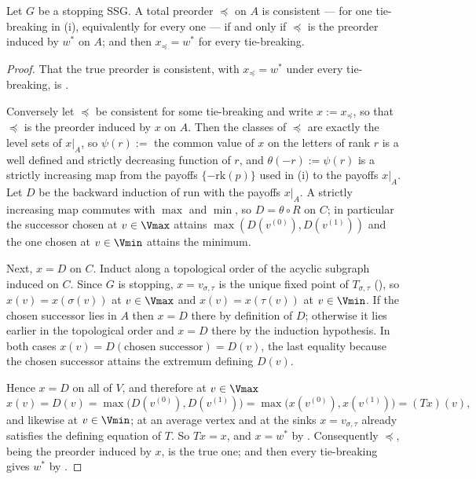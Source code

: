\begin{theorem}\label{ol:unique}
Let $G$ be a stopping SSG. A total preorder $\preceq$ on $A$ is consistent
--- for one tie-breaking in (i), equivalently for
every one --- if and only if $\preceq$ is the preorder induced by $w^\ast$
on $A$; and then $x_\preceq=w^\ast$ for every tie-breaking.
\end{theorem}

\begin{proof}
That the true preorder is consistent, with $x_\preceq=w^\ast$ under every
tie-breaking, is .

Conversely let $\preceq$ be consistent for some tie-breaking and write
$x:=x_{\preceq}$, so that $\preceq$ is the preorder induced by $x$ on $A$.
Then the classes of $\preceq$ are exactly the level sets of $x|_A$, so
$\psi(r):=$ the common value of $x$ on the letters of rank $r$ is a well
defined and strictly decreasing function of $r$, and
$\theta(-r):=\psi(r)$ is a strictly increasing map from the payoffs
$\{-\mathrm{rk}(p)\}$ used in (i) to the payoffs
$x|_A$. Let $D$ be the backward induction of  run with
the payoffs $x|_A$. A strictly increasing map commutes with $\max$ and
$\min$, so $D=\theta\circ R$ on $C$; in particular the successor chosen at
$v\in\Vmax$ attains $\max(D(v^{(0)}),D(v^{(1)}))$ and the one chosen at
$v\in\Vmin$ attains the minimum.

Next, $x=D$ on $C$. Induct along a topological order of the acyclic
subgraph induced on $C$. Since $G$ is stopping, $x=v_{\sigma,\tau}$ is the
unique fixed point of $T_{\sigma,\tau}$ (), so
$x(v)=x(\sigma(v))$ at $v\in\Vmax$ and $x(v)=x(\tau(v))$ at $v\in\Vmin$.
If the chosen successor lies in $A$ then $x=D$ there by definition of $D$;
otherwise it lies earlier in the topological order and $x=D$ there by the
induction hypothesis. In both cases
$x(v)=D(\text{chosen successor})=D(v)$, the last equality because the
chosen successor attains the extremum defining $D(v)$.

Hence $x=D$ on all of $V$, and therefore at $v\in\Vmax$
\[
  x(v)=D(v)=\max\bigl(D(v^{(0)}),D(v^{(1)})\bigr)
       =\max\bigl(x(v^{(0)}),x(v^{(1)})\bigr)=(Tx)(v),
\]
and likewise at $v\in\Vmin$; at an average vertex and at the sinks
$x=v_{\sigma,\tau}$ already satisfies the defining equation of $T$. So
$Tx=x$, and $x=w^\ast$ by . Consequently $\preceq$,
being the preorder induced by $x$, is the true one; and then every
tie-breaking gives $w^\ast$ by .
\end{proof}

